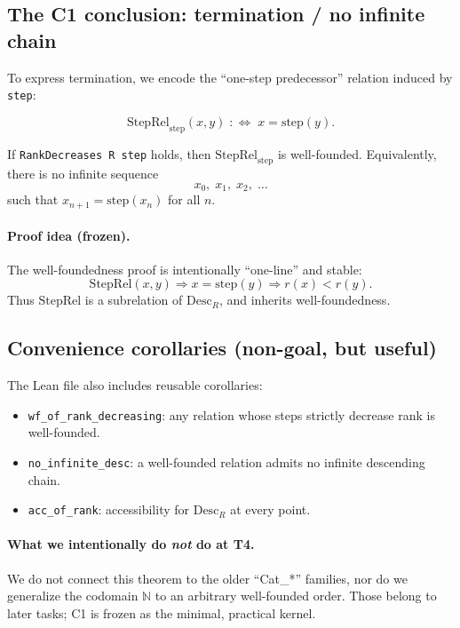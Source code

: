 \subsection{The C1 conclusion: termination / no infinite chain}
To express termination, we encode the ``one-step predecessor'' relation induced by \texttt{step}:

\begin{definition}
\label{def:steprel}
\[
  \mathrm{StepRel}_{\mathrm{step}}(x,y) \;:\!\!\iff\; x = \mathrm{step}(y).
\]
\end{definition}

\begin{theorem}
\label{thm:c1-wf-steprel}
If \texttt{RankDecreases R step} holds, then $\mathrm{StepRel}_{\mathrm{step}}$ is well-founded.
Equivalently, there is no infinite sequence
\[
  x_0,\; x_1,\; x_2,\;\dots
\]
such that $x_{n+1} = \mathrm{step}(x_n)$ for all $n$.
\end{theorem}

\paragraph{Proof idea (frozen).}
The well-foundedness proof is intentionally ``one-line'' and stable:
\[
  \mathrm{StepRel}(x,y)\Rightarrow x=\mathrm{step}(y)\Rightarrow r(x)<r(y).
\]
Thus $\mathrm{StepRel}$ is a subrelation of $\mathrm{Desc}_R$, and inherits well-foundedness.

\subsection{Convenience corollaries (non-goal, but useful)}
The Lean file also includes reusable corollaries:
\begin{itemize}
\item \texttt{wf\_of\_rank\_decreasing}: any relation whose steps strictly decrease rank is well-founded.
\item \texttt{no\_infinite\_desc}: a well-founded relation admits no infinite descending chain.
\item \texttt{acc\_of\_rank}: accessibility for $\mathrm{Desc}_R$ at every point.
\end{itemize}

\paragraph{What we intentionally do \emph{not} do at T4.}
We do not connect this theorem to the older ``Cat\_*'' families, nor do we generalize the codomain
$\mathbb{N}$ to an arbitrary well-founded order. Those belong to later tasks; C1 is frozen as the
minimal, practical kernel.
